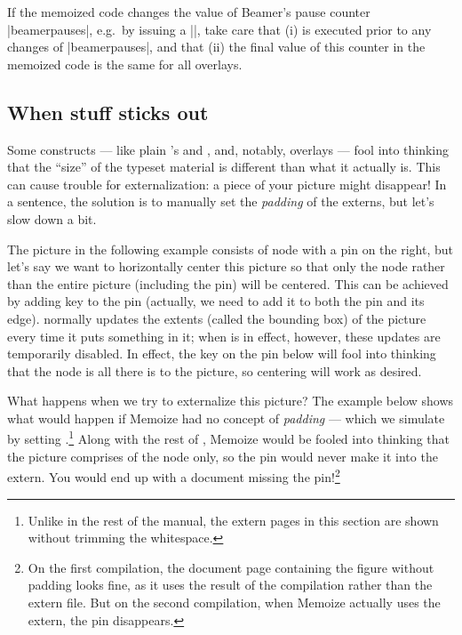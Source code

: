 \documentclass[a4paper,11pt]{article}
\begin{document}
\begin{tcolorbox}[warning]
  If the memoized code changes the value of Beamer's pause counter
  |beamerpauses|, e.g.\ by issuing a |\pause|, take care that (i)  is executed prior to any changes of |beamerpauses|, and that (ii)
  the final value of this counter in the memoized code is the same for all
  overlays.
\end{tcolorbox}


\subsection{When stuff sticks out}
\label{sec:tut:padding}

Some constructs --- like plain 's  and ,
and, notably, \TikZ overlays --- fool  into thinking that the
``size'' of the typeset material is different than what it actually is.  This
can cause trouble for externalization: a piece of your picture might disappear!
In a sentence, the solution is to manually set the \emph{padding} of the
externs, but let's slow down a bit.

The \TikZ picture in the following example consists of node with a pin on the
right, but let's say we want to horizontally center this picture so that only
the node rather than the entire picture (including the pin) will be centered.
This can be achieved by adding key  to the pin (actually,
we need to add it to both the pin and its edge).  \TikZ normally updates the
extents (called the bounding box) of the picture every time it puts something
in it; when  is in effect, however, these updates are
temporarily disabled.  In effect, the  key on the pin
below will fool  into thinking that the node is all there is to the
picture, so centering will work as desired.


What happens when we try to externalize this picture?  The example below shows
what would happen if Memoize had no concept of \emph{padding} --- which we
simulate by setting .\footnote{Unlike in the rest of
  the manual, the extern pages in this section are shown without trimming the
  whitespace.}  Along with the rest of , Memoize would be fooled
into thinking that the picture comprises of the node only, so the pin would
never make it into the extern.  You would end up with a document missing the
pin!\footnote{On the first compilation, the document page containing the figure
  without padding looks fine, as it uses the result of the compilation rather
  than the extern file.  But on the second compilation, when Memoize actually
  uses the extern, the pin disappears.}
\end{document}
